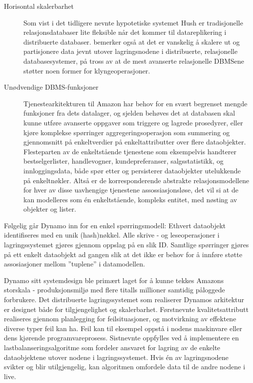 \begin{description}
  \item [Horisontal skalerbarhet] Som vist i det tidligere nevnte hypotetiske systemet Hush \citep{george2011} er tradisjonelle relasjonsdatabaser lite fleksible når det kommer til datareplikering i distribuerte databaser. \cite{decandia2007} bemerker også at det er vanskelig å skalere ut og partisjonere data jevnt utover lagringsnodene i distribuerte, relasjonelle databasesystemer, på tross av at de mest avanserte relasjonelle DBMSene støtter noen former for klyngeoperasjoner.
  \item [Unødvendige DBMS-funksjoner] Tjenestearkitekturen til Amazon har behov for en svært begrenset mengde funksjoner fra dets datalager, og sjelden behøves det at databasen skal kunne utføre avanserte oppgaver som triggere og lagrede prosedyrer, eller kjøre komplekse spørringer aggregeringsoperasjon som summering og gjennomsnitt på enkeltverdier på enkeltattributter over flere dataobjekter. Flesteparten av de enkeltstående tjenestene som eksempelvis handterer bestselgerlister, handlevogner, kundepreferanser, salgsstatistikk, og innloggingsdata, både spør etter og persisterer dataobjekter utelukkende på enkeltnøkler. Altså er de korresponderende abstrakte relasjonsmodellene for hver av disse uavhengige tjenestene assossiasjonsløse, det vil si at de kan modelleres som én enkeltstående, kompleks entitet, med nøsting av objekter og lister.
\end{description}

Følgelig går Dynamo inn for en enkel spørringsmodell: Ethvert dataobjekt identifiseres med en unik (hash)nøkkel. Alle skrive - og leseoperasjoner i lagringssystemet gjøres gjennom oppslag på en slik ID. Samtlige spørringer gjøres på ett enkelt dataobjekt ad gangen slik at det ikke er behov for å innføre støtte assosiasjoner mellom ''tuplene'' i datamodellen.  %

Dynamo sitt systemdesign ble primært laget for å kunne tekkes Amazons storskala - produksjonsmiljø med flere titalls millioner samtidig påloggede forbrukere. Det distribuerte lagringssystemet som realiserer Dynamos arkitektur er designet både for tilgjengelighet og skalerbarhet. Førstnevnte kvalitetsattributt realiseres gjennom planlegging for feilsituasjoner, og motvirkning av effektene diverse typer feil kan ha. Feil kan til eksempel oppstå i nodens maskinvare eller dens kjørende programvareprosess. Sistnevnte oppfylles ved å implementere en lastbalanseringsalgoritme som fordeler ansvaret for lagring av de enkelte dataobjektene utover nodene i lagringssystemet. Hvis én av lagringsnodene svikter og blir utilgjengelig, kan algoritmen omfordele data til de andre nodene i live.

